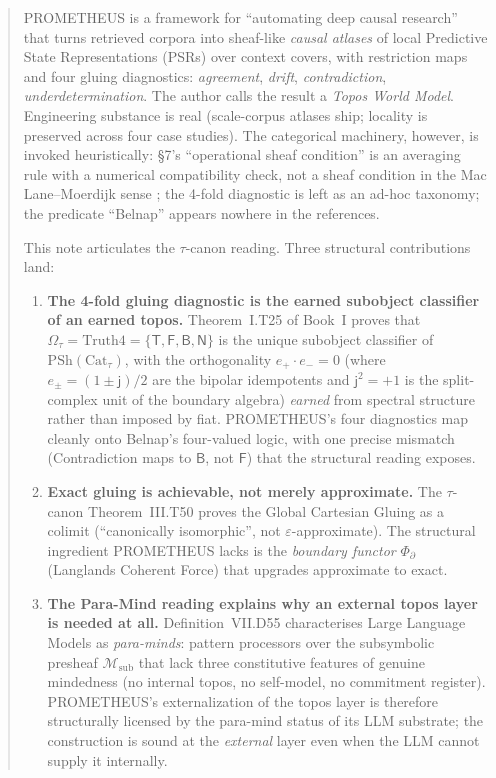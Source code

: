 \documentclass{pantarhei-researchnote}
\newcommand{\jj}{\mathsf{j}}
\newcommand{\PsiD}{\ensuremath{\Phi_{\partial}}}
\newcommand{\Truth}{\ensuremath{\mathrm{Truth4}}}
\newcommand{\Omegatau}{\ensuremath{\Omega_{\tau}}}
\newcommand{\Cattau}{\ensuremath{\mathrm{Cat}_{\tau}}}
\newcommand{\PSh}{\ensuremath{\mathrm{PSh}}}
\newcommand{\Msub}{\ensuremath{\mathcal{M}_{\mathrm{sub}}}}
\begin{document}
\begin{abstract}
\noindent
PROMETHEUS \cite{Mahadevan-PROMETHEUS-2026} is a framework for
``automating deep causal research'' that turns retrieved corpora into
sheaf-like \emph{causal atlases} of local Predictive State
Representations (PSRs) over context covers, with restriction maps
and four gluing diagnostics: \emph{agreement}, \emph{drift},
\emph{contradiction}, \emph{underdetermination}. The author calls
the result a \emph{Topos World Model}. Engineering substance is
real (scale-corpus atlases ship; locality is preserved across four
case studies). The categorical machinery, however, is invoked
heuristically: §7's ``operational sheaf condition'' is an averaging
rule with a numerical compatibility check, not a sheaf condition in
the Mac Lane--Moerdijk sense \cite{MacLane-Moerdijk-1992}; the
4-fold diagnostic is left as an ad-hoc taxonomy; the predicate
``Belnap'' \cite{Belnap-1977,Dunn-1976} appears nowhere in the
references.

This note articulates the $\tau$-canon reading. Three structural
contributions land:

\begin{enumerate}
\item \textbf{The 4-fold gluing diagnostic is the earned subobject
classifier of an earned topos.} Theorem~I.T25 of Book~I
\cite{PantaRhei-BookI} proves that $\Omegatau = \Truth =
\{\mathsf{T}, \mathsf{F}, \mathsf{B}, \mathsf{N}\}$ is the unique
subobject classifier of $\PSh(\Cattau)$, with the orthogonality
$e_{+} \cdot e_{-} = 0$ (where $e_{\pm} = (1 \pm \jj)/2$ are the
bipolar idempotents and $\jj^{2} = +1$ is the split-complex unit of
the boundary algebra) \emph{earned} from spectral structure rather
than imposed by fiat. PROMETHEUS's four diagnostics map cleanly onto
Belnap's four-valued logic, with one precise mismatch (Contradiction
maps to $\mathsf{B}$, not $\mathsf{F}$) that the structural reading
exposes.

\item \textbf{Exact gluing is achievable, not merely approximate.}
The $\tau$-canon Theorem~III.T50 \cite{PantaRhei-BookIII} proves the
Global Cartesian Gluing as a colimit (``canonically isomorphic'',
not $\varepsilon$-approximate). The structural ingredient PROMETHEUS
lacks is the \emph{boundary functor} $\PsiD$ (Langlands Coherent
Force) that upgrades approximate to exact.

\item \textbf{The Para-Mind reading explains why an external topos
layer is needed at all.} Definition~VII.D55 \cite{PantaRhei-BookVII}
characterises Large Language Models as \emph{para-minds}: pattern
processors over the subsymbolic presheaf $\Msub$ that lack three
constitutive features of genuine mindedness (no internal topos, no
self-model, no commitment register). PROMETHEUS's externalization of
the topos layer is therefore structurally licensed by the para-mind
status of its LLM substrate; the construction is sound at the
\emph{external} layer even when the LLM cannot supply it
internally.
\end{enumerate}


\end{abstract}
\end{document}
